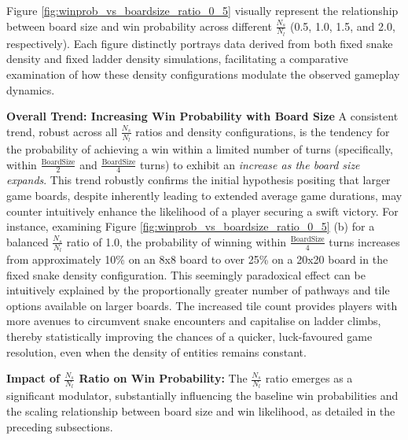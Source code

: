 Figure \ref{fig:winprob_vs_boardsize_ratio_0_5} visually represent the relationship between board size and win probability across different $\frac{N_s}{N_l}$ (0.5, 1.0, 1.5, and 2.0, respectively). Each figure distinctly portrays data derived from both fixed snake density and fixed ladder density simulations, facilitating a comparative examination of how these density configurations modulate the observed gameplay dynamics.

\noindent\textbf{Overall Trend: Increasing Win Probability with Board Size} A consistent trend, robust across all $\frac{N_s}{N_l}$ ratios and density configurations, is the tendency for the probability of achieving a win within a limited number of turns (specifically, within $\frac{\text{BoardSize}}{2}$ and $\frac{\text{BoardSize}}{4}$ turns) to exhibit an \textit{increase as the board size expands}. This trend robustly confirms the initial hypothesis positing that larger game boards, despite inherently leading to extended average game durations, may counter intuitively enhance the likelihood of a player securing a swift victory.  For instance, examining Figure \ref{fig:winprob_vs_boardsize_ratio_0_5} (b) for a balanced $\frac{N_s}{N_l}$ ratio of 1.0, the probability of winning within $\frac{\text{BoardSize}}{4}$ turns increases from approximately 10\% on an 8x8 board to over 25\% on a 20x20 board in the fixed snake density configuration. This seemingly paradoxical effect can be intuitively explained by the proportionally greater number of pathways and tile options available on larger boards.  The increased tile count provides players with more avenues to circumvent snake encounters and capitalise on ladder climbs, thereby statistically improving the chances of a quicker, luck-favoured game resolution, even when the density of entities remains constant.

\noindent\textbf{Impact of $\frac{N_s}{N_l}$ Ratio on Win Probability:}  The $\frac{N_s}{N_l}$ ratio emerges as a significant modulator, substantially influencing the baseline win probabilities and the scaling relationship between board size and win likelihood, as detailed in the preceding subsections.

